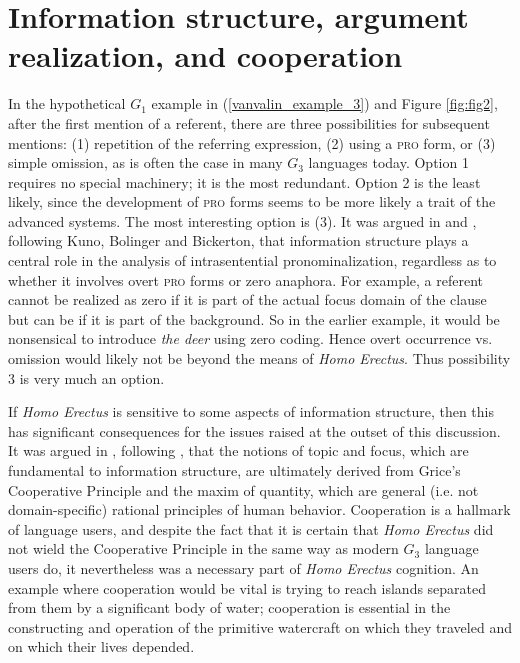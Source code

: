 \documentclass[output=paper,colorlinks,citecolor=brown]{langscibook}
\begin{document}
\section{Information structure, argument realization, and cooperation}\label{sec:vanvalin:4}

In the hypothetical $G_1$ example in (\ref{vanvalin_example_3}) and Figure \ref{fig:fig2}, after the first mention of a referent, there are three possibilities for subsequent mentions: (1) repetition of the referring expression, (2) using a \textsc{pro} form, or  (3) simple omission, as is often the case in many $G_3$ languages today.  Option 1 requires no special machinery; it is the most redundant.  Option 2 is the least likely, since the development of \textsc{pro} forms seems to be more likely a trait of the advanced systems.  The most interesting option is (3).  It was argued in \citet{van1990functionalism} and \citet{van1997syntax}, following Kuno, Bolinger and Bickerton, that information structure plays a central role in the analysis of intrasentential pronominalization, regardless as to whether it involves overt \textsc{pro} forms or zero anaphora.  For example, a referent cannot be realized as zero if it is part of the actual focus 
domain of the clause but can be if it is part of the background.  So in the earlier example, it would be nonsensical to introduce \emph{the deer} using zero coding.  Hence overt occurrence vs. omission would likely not be beyond the means of \emph{Homo Erectus}.  Thus possibility 3 is very much an option.

If \emph{Homo Erectus} is sensitive to some aspects of information structure, then this has significant consequences for the issues raised at the outset of this discussion.  It was argued in \citet{van1993synopsis}, following \citet{kempson1975presupposition}, that the notions of topic and focus, which are fundamental to information structure, are ultimately derived from Grice’s Cooperative Principle and the maxim of quantity, which are general (i.e. not domain-specific) rational principles of human behavior.  Cooperation is a hallmark of language users, and despite the fact that it is certain that \emph{Homo Erectus} did not wield the Cooperative Principle in the same way as modern $G_3$ language users do, it nevertheless was a necessary part of \emph{Homo Erectus} cognition.  An example where cooperation would be vital is trying to reach islands separated from them by a significant body of water; cooperation is essential in the constructing and operation of the primitive watercraft on which they traveled and on which their lives depended.
\end{document}
